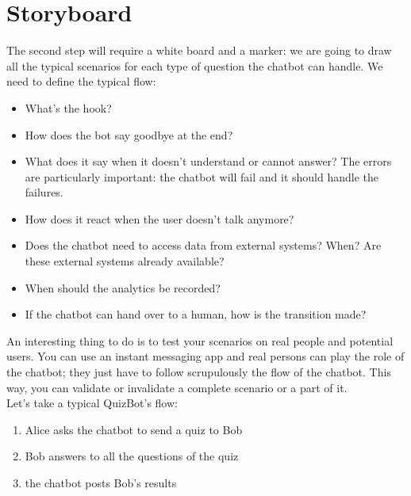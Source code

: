 \documentclass{article}
\begin{document}
\section{Storyboard}
The second step will require a white board and a marker: we are going to draw all the typical scenarios for each type of question the chatbot can handle. We need to define the typical flow: 
\begin{itemize}
    \item What’s the hook? 
    \item How does the bot say goodbye at the end? 
    \item What does it say when it doesn’t understand or cannot answer? The errors are particularly important: the chatbot will fail and it should handle the failures.
    \item How does it react when the user doesn’t talk anymore?
    \item Does the chatbot need to access data from external systems? When? Are these external systems already available?
    \item When should the analytics be recorded?
    \item If the chatbot can hand over to a human, how is the transition made?
\end{itemize}


An interesting thing to do is to test your scenarios on real people and potential users. You can use an instant messaging app and real persons can play the role of the chatbot; they just have to follow scrupulously the flow of the chatbot. This way, you can validate or invalidate a complete scenario or a part of it.\\
\break
Let’s take a typical QuizBot's flow: 
\begin{enumerate}
    \item Alice asks the chatbot to send a quiz to Bob
    \item Bob answers to all the questions of the quiz
    \item the chatbot posts Bob’s results
\end{enumerate}
\end{document}
